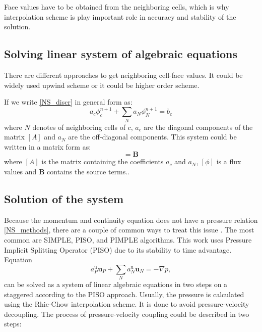 Face values have to be obtained from the neighboring cells, which is why interpolation scheme is play important role in accuracy and stability of the solution.

\subsection{Solving linear system of algebraic equations}
There are different approaches to get neighboring cell-face values. It could be widely used upwind scheme or it could be higher order scheme.

If we write \ref{NS_discr} in general form as:
\begin{equation}
a_{c} \phi_{c}^{n+1}+\sum_{N} a_{N} \phi_{N}^{n+1}=b_{c}
\end{equation}
where $N$ denotes of neighboring cells of $c$,  $a_c$ are the diagonal components of the matrix $[A]$ and $a_N$ are the off-diagonal components. This system could be written in a matrix form as:
\begin{equation}
[A][\phi]=\mathbf{B}
\end{equation}
where $[A]$ is the matrix containing the coefficients $a_c$ and $a_N$, $[\phi]$ is a flux values and $\mathbf{B}$ contains the source terms..

\subsection{Solution of the system}\label{p-v-coupling}
Because the momentum and continuity equation does not have a pressure relation \ref{NS_methods}, there are a couple of common ways to treat this issue \cite{ferziger2002cfd}. The most common are SIMPLE, PISO, and PIMPLE algorithms. This work uses Pressure Implicit Splitting Operator (PISO) \cite{ferziger2002cfd} due to its stability to time advantage. Equation
\begin{equation}\label{NS_algebraic}
    a_{P}^{\mathrm{u}} \mathbf{u}_{P}+\sum_{N} a_{N}^{\mathrm{u}} \mathbf{u}_{N}= -\nabla p,
\end{equation}
can be solved as a system of linear algebraic equations in two steps on a staggered according to the PISO approach. Usually, the pressure is calculated using the Rhie-Chow\cite{rhie} interpolation scheme. It is done to avoid pressure-velocity decoupling. The process of pressure-velocity coupling could be described in two steps:

